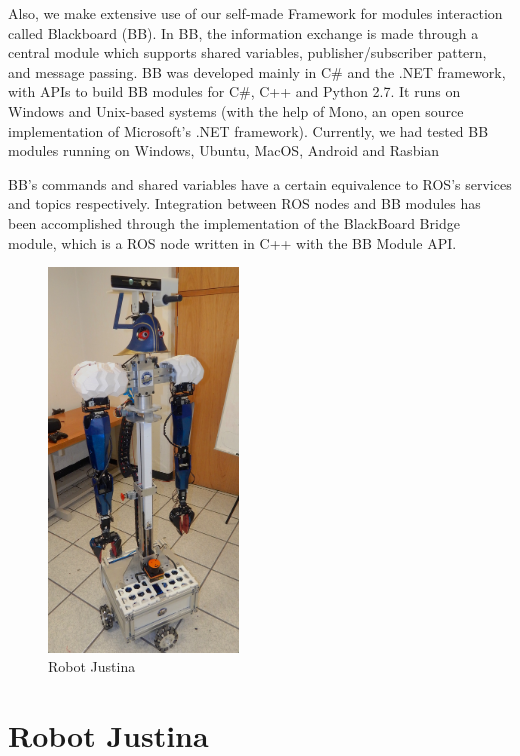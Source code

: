 \documentclass{llncs}
\begin{document}
Also, we make extensive use of our self-made Framework for modules interaction called Blackboard (BB). In BB, the information exchange is made through a central module which supports shared variables, publisher/subscriber pattern, and message passing. BB was developed mainly in C\# and the .NET framework, with APIs to build BB modules for C\#, C++ and Python 2.7. It runs on Windows and Unix-based systems (with the help of Mono, an open source implementation of Microsoft's .NET framework). Currently, we had tested BB modules running on Windows, Ubuntu, MacOS, Android and Rasbian

BB's commands and shared variables have a certain equivalence to ROS's services and topics respectively. Integration between ROS nodes and BB modules has been accomplished through the implementation of the BlackBoard Bridge module, which is a ROS node written in C++ with the BB Module API.


\begin{figure}[h]
	\centering
	\includegraphics[width=0.45\textwidth]{Figures/justina2017.jpg}
	\caption{Robot Justina}
	\label{fig:justina}
\end{figure}

\section{Robot Justina}\label{sec:Justina}
\end{document}
